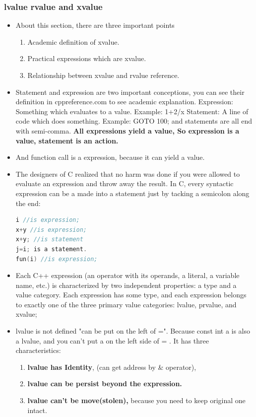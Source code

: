 \documentclass[a4paper,12pt,twoside]{book}
\begin{document}
\subsubsection{lvalue rvalue and xvalue}
\begin{itemize}

\item About this section, there are three important points
\begin{enumerate}
\item Academic definition of xvalue.
\item Practical expressions which are xvalue.
\item Relationship between xvalue and rvalue reference.
\end{enumerate}

\item  Statement and expression are two important conceptions, you can see their definition in cppreference.com to see academic explanation.
Expression: Something which evaluates to a value. Example: 1+2/x
Statement: A line of code which does something. Example: GOTO 100; and statements are all end with semi-comma. \textbf{All expressions yield a value, So expression is a value, statement is an action.}

\item And function call is a expression, because it can yield a value.

\item The designers of C realized that no harm was done if you were allowed to evaluate an expression and throw away the result. In C, every syntactic expression can be a made into a statement just by tacking a semicolon along the end:

\begin{lstlisting}[frame=single, language=c++]
i //is expression;
x+y //is expression;
x+y; //is statement
j=i; is a statement.
fun(i) //is expression;
\end{lstlisting}

\item Each C++ expression (an operator with its operands, a literal, a variable name, etc.) is characterized by two independent properties: a type and a value category. Each expression has some type, and each expression belongs to exactly one of the three primary value categories: lvalue, prvalue, and xvalue;

\item lvalue is not defined "can be put on the left of =". Because const int a is also a lvalue, and you can't put a on the left side of = . It has three characteristics:
\begin{enumerate}
\item\textbf{ lvalue has Identity}, (can get address by \& operator),
\item \textbf{lvalue can be persist beyond the expression. }
\item \textbf{lvalue can't be move(stolen),} because you need to keep original one intact.
\end{enumerate}


\end{itemize}
\end{document}
